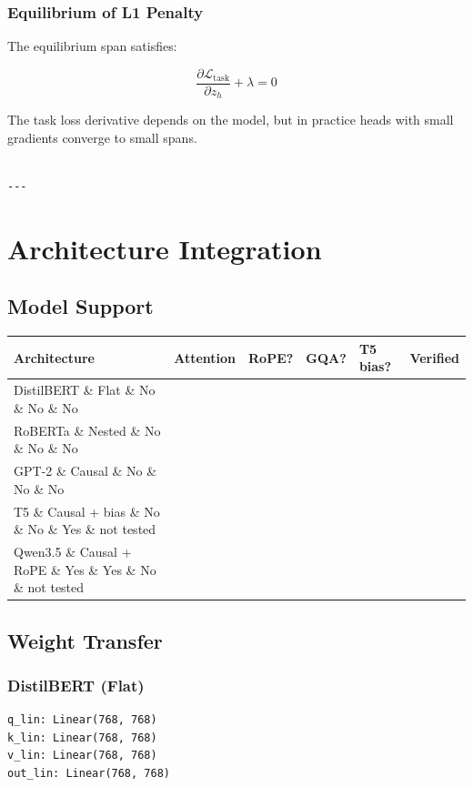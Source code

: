 \subsubsection{Equilibrium of L1 Penalty}

The equilibrium span satisfies:

\[
\frac{\partial \mathcal{L}_\text{task}}{\partial z_h} + \lambda = 0
\]

The task loss derivative depends on the model, but in practice heads with 
small gradients converge to small spans.
\begin{lstlisting}

---
\end{lstlisting}


\section{Architecture Integration}

\subsection{Model Support}

\begin{table}[H]
\centering
\small
\begin{tabular}{llllll}
\toprule
\textbf{Architecture} & \textbf{Attention} & \textbf{RoPE?} & \textbf{GQA?} & \textbf{T5 bias?} & \textbf{Verified} \\
\midrule
DistilBERT \& Flat \& No \& No \& No &  \\
RoBERTa \& Nested \& No \& No \& No &  \\
GPT-2 \& Causal \& No \& No \& No &  \\
T5 \& Causal + bias \& No \& No \& Yes \& not tested \\
Qwen3.5 \& Causal + RoPE \& Yes \& Yes \& No \& not tested \\
\bottomrule
\end{tabular}
\end{table}

\subsection{Weight Transfer}

\subsubsection{DistilBERT (Flat)}

\begin{lstlisting}
q_lin: Linear(768, 768)
k_lin: Linear(768, 768)
v_lin: Linear(768, 768)
out_lin: Linear(768, 768)
\end{lstlisting}

